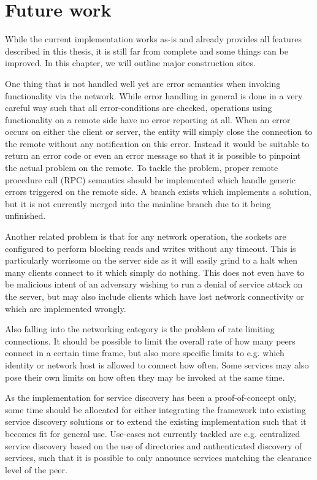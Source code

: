 \chapter{Future work}

While the current implementation works as-is and already provides all features described in this thesis, it is still far from complete and some things can be improved.
In this chapter, we will outline major construction sites.

One thing that is not handled well yet are error semantics when invoking functionality via the network.
While error handling in general is done in a very careful way such that all error-conditions are checked, operations using functionality on a remote side have no error reporting at all.
When an error occurs on either the client or server, the entity will simply close the connection to the remote without any notification on this error.
Instead it would be suitable to return an error code or even an error message so that it is possible to pinpoint the actual problem on the remote.
To tackle the problem, proper remote procedure call (RPC) semantics should be implemented which handle generic errors triggered on the remote side.
A branch exists which implements a solution, but it is not currently merged into the mainline branch due to it being unfinished.

Another related problem is that for any network operation, the sockets are configured to perform blocking reads and writes without any timeout.
This is particularly worrisome on the server side as it will easily grind to a halt when many clients connect to it which simply do nothing.
This does not even have to be malicious intent of an adversary wishing to run a denial of service attack on the server, but may also include clients which have lost network connectivity or which are implemented wrongly.

Also falling into the networking category is the problem of rate limiting connections.
It should be possible to limit the overall rate of how many peers connect in a certain time frame, but also more specific limits to e.g. which identity or network host is allowed to connect how often.
Some services may also pose their own limits on how often they may be invoked at the same time.

As the implementation for service discovery has been a proof-of-concept only, some time should be allocated for either integrating the framework into existing service discovery solutions or to extend the existing implementation such that it becomes fit for general use.
Use-cases not currently tackled are e.g. centralized service discovery based on the use of directories and authenticated discovery of services, such that it is possible to only announce services matching the clearance level of the peer.

